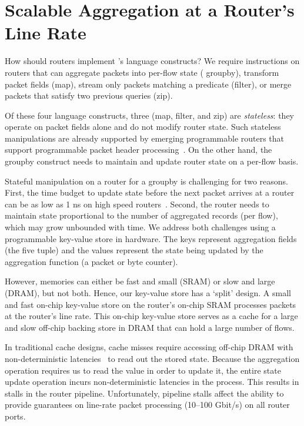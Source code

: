 \section{Scalable Aggregation at a Router's Line Rate}
\label{sec:aggregation}

How should routers implement \TheSystem's language constructs? We require
instructions on routers that can aggregate packets into per-flow state ({\ct
groupby}), transform packet fields ({\ct map}), stream only packets matching a
predicate ({\ct filter}), or merge packets that satisfy two previous queries
({\ct zip}).

Of these four language constructs, three ({\ct map}, {\ct filter}, and {\ct
zip}) are {\em stateless}: they operate on packet fields alone and do not
modify router state. Such stateless manipulations are already supported by
emerging programmable routers that support programmable packet header
processing~\cite{rmt, xpliant, flexpipe, tofino}. On the other hand, the {\ct
groupby} construct needs to maintain and update router state on a per-flow
basis.


Stateful manipulation on a router for a {\ct groupby} is challenging for two
reasons. First, the time budget to update state before the next packet arrives
at a router can be as low as 1 ns on high speed routers~\cite{domino_sigcomm}.
Second, the router needs to maintain state proportional to the number of
aggregated records (\eg per flow), which may grow unbounded with time. We
address both challenges using a programmable key-value store in hardware. The
keys represent aggregation fields (\eg the five tuple) and the values represent
the state being updated by the aggregation function (\eg a packet or byte
counter). 

However, memories can either be fast and small (SRAM) or slow and large (DRAM),
but not both. Hence, our key-value store has a `split' design.  A small and
fast on-chip key-value store on the router's on-chip SRAM processes packets at
the router's line rate. This on-chip key-value store serves as a cache for a
large and slow off-chip backing store in DRAM that can hold a large number of
flows.

 In traditional cache designs, cache misses require accessing off-chip DRAM
with non-deterministic latencies~\cite{unpredictable_cache} to read out the
stored state. Because the aggregation operation requires us to read the value
in order to update it, the entire state update operation incurs
non-deterministic latencies in the process.  This results in stalls in the
router pipeline. Unfortunately, pipeline stalls affect the ability to provide
guarantees on line-rate packet processing (10--100 Gbit/s) on all router ports.

